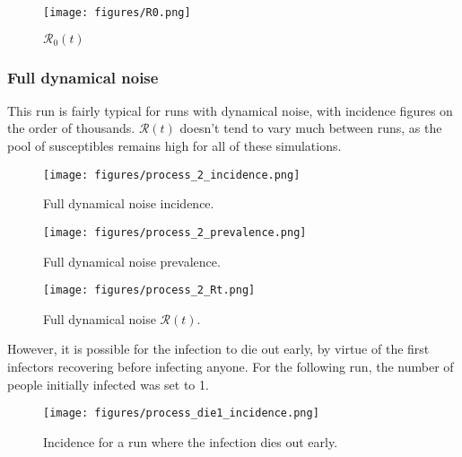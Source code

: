 \documentclass{article}
\newcommand{\nR}{\mathscr{R}}
\begin{document}
\begin{figure}[h!]
    \centering
    \texttt{[image: figures/R0.png]}
    \caption{$\nR_0(t)$}
    \label{fig:my_label}
\end{figure}

\subsubsection{Full dynamical noise}
This run is fairly typical for runs with dynamical noise, with incidence figures on the order of thousands. $\nR(t)$ doesn't tend to vary much between runs, as the pool of susceptibles remains high for all of these simulations.

\begin{figure}[h!]
    \centering
    \texttt{[image: figures/process\_2\_incidence.png]}
    \caption{Full dynamical noise incidence.}
\end{figure}

\clearpage
\begin{figure}[h!]
\centering
\texttt{[image: figures/process\_2\_prevalence.png]}
\caption{Full dynamical noise prevalence.}
\end{figure}

\begin{figure}[h!]
\centering
\texttt{[image: figures/process\_2\_Rt.png]}
\caption{Full dynamical noise $\nR(t)$.}
\end{figure}

However, it is possible for the infection to die out early, by virtue of the first infectors recovering before infecting anyone. For the following run, the number of people initially infected was set to 1.

\begin{figure}[h!]
\centering
\texttt{[image: figures/process\_die1\_incidence.png]}
\caption{Incidence for a run where the infection dies out early.}
\end{figure}
\end{document}
